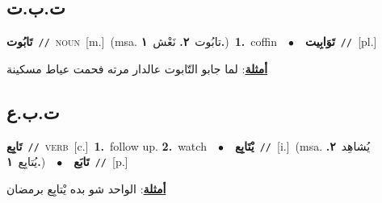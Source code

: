 \documentclass[10pt,a4paper,twoside]{article} %
\begin{document}
\begin{multicols}{2}
{\vspace{-3mm}
\subsection*{\color{blue}\foreignlanguage{arabic}{ت.ب.ت}\color{blue}{}} 

{\setlength\topsep{0pt}\textbf{\foreignlanguage{arabic}{تَابُوت}}\ {\color{gray}\texttt{//}\color{black}}\ \textsc{noun}\ [m.]\ \color{gray}(msa. \foreignlanguage{arabic}{تابُوت}~\foreignlanguage{arabic}{\textbf{٢.}}  \foreignlanguage{arabic}{نَعْش}~\foreignlanguage{arabic}{\textbf{١.}})\color{black}\ \textbf{1.}~coffin\ \ $\bullet$\ \ \setlength\topsep{0pt}\textbf{\foreignlanguage{arabic}{تَوَابِيت}}\ {\color{gray}\texttt{//}\color{black}}\ [pl.]\  \begin{flushright}\color{gray}\foreignlanguage{arabic}{\textbf{\underline{\foreignlanguage{arabic}{أمثلة}}}: لما جابو التّابوت عالدار مرته فحمت عياط مسكينة}\end{flushright}\color{black}} \vspace{2mm}

\vspace{-3mm}
\subsection*{\color{blue}\foreignlanguage{arabic}{ت.ب.ع}\color{blue}{}} 

{\setlength\topsep{0pt}\textbf{\foreignlanguage{arabic}{تَابِع}}\ {\color{gray}\texttt{//}\color{black}}\ \textsc{verb}\ [c.]\ \textbf{1.}~follow up.  \textbf{2.}~watch\ \ $\bullet$\ \ \setlength\topsep{0pt}\textbf{\foreignlanguage{arabic}{يْتَابِع}}\ {\color{gray}\texttt{//}\color{black}}\ [i.]\ \color{gray}(msa. \foreignlanguage{arabic}{يُشاهِد}~\foreignlanguage{arabic}{\textbf{٢.}}  \foreignlanguage{arabic}{يُتابِع}~\foreignlanguage{arabic}{\textbf{١.}})\color{black}\ \ $\bullet$\ \ \setlength\topsep{0pt}\textbf{\foreignlanguage{arabic}{تَابَع}}\ {\color{gray}\texttt{//}\color{black}}\ [p.]\  \begin{flushright}\color{gray}\foreignlanguage{arabic}{\textbf{\underline{\foreignlanguage{arabic}{أمثلة}}}: الواحد شو بده يْتابِع برمضان}\end{flushright}\color{black}} \vspace{2mm}

}
\end{multicols}
\end{document}
